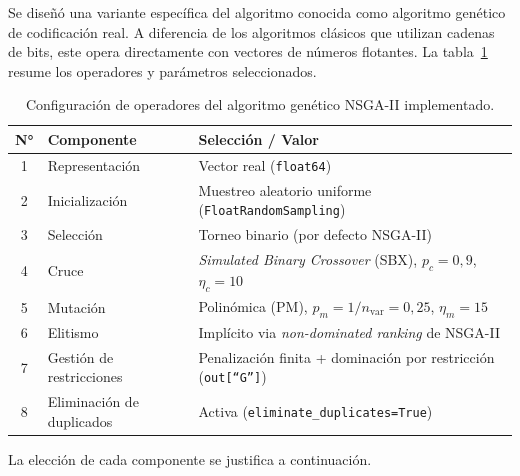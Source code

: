 Se diseñó una variante específica del algoritmo conocida como algoritmo
genético de codificación real. A diferencia de los algoritmos clásicos que
utilizan cadenas de bits, este opera directamente con vectores de números
flotantes. La tabla~\ref{tab:configuracion_ag} resume los operadores y
parámetros seleccionados.

\begin{table}[h]
  \centering
  \caption{Configuración de operadores del algoritmo genético NSGA-II implementado.}
  \label{tab:configuracion_ag}
  \begin{tabular}{c p{} p{}}
    \toprule
    \textbf{N°} & \textbf{Componente} & \textbf{Selección / Valor} \\
    \midrule
    1  & Representación           & Vector real (\texttt{float64})              \\
    2  & Inicialización           & Muestreo aleatorio uniforme (\texttt{FloatRandomSampling}) \\
    3  & Selección                & Torneo binario (por defecto NSGA-II)        \\
    4  & Cruce                    & \textit{Simulated Binary Crossover} (SBX), $p_c=0{,}9$, $\eta_c=10$ \\
    5  & Mutación                 & Polinómica (PM), $p_m=1/n_{\text{var}}=0{,}25$, $\eta_m=15$ \\
    6  & Elitismo                 & Implícito via \textit{non-dominated ranking} de NSGA-II \\
    7  & Gestión de restricciones & Penalización finita + dominación por restricción (\texttt{out[``G'']}) \\
    8  & Eliminación de duplicados & Activa (\texttt{eliminate\_duplicates=True}) \\
    \bottomrule
  \end{tabular}
\end{table}

La elección de cada componente se justifica a continuación.

